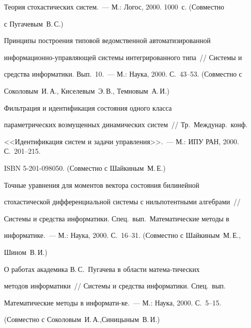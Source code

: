




 Теория стохастических систем.~--- М.: Логос, 2000. 1000~с. (Совместно


с Пугачевым~В.\,С.)





 Принципы построения типовой ведомственной автоматизированной


информационно-управляющей системы интегрированного типа~// Системы и


средства информатики. Вып.~10.~--- М.: Наука, 2000. С.~43--53. (Совместно с


Соколовым~И.\,А., Киселевым~Э.\,В., Темновым~А.\,И.)





 Фильтрация и идентификация состояния одного класса


параметрических возмущенных динамических систем~// Тр.\ Междунар.\ конф.\


<<Идентификация систем и задачи управления>>.~--- М.: ИПУ РАН, 2000. С.~201--215.


ISBN 5-201-098050. (Совместно с Шайкиным~М.\,Е.)





 Точные уравнения для моментов вектора состояния билинейной


стохастической дифференциальной системы с нильпотентными алгебрами~//


Системы и средства информатики. Спец.\ вып.\ Математические методы в


информатике.~--- М.: Наука, 2000. С.~16--31. (Совместно с Шайкиным~М.\,Е.,


Шином~В.\,И.)





 О работах академика В.\,С.~Пугачева в области ма\-те\-ма-\linebreak тических


методов информатики~// Системы и средства ин\-фор\-матики. Спец.\ вып.\


Математические методы в информати-\linebreak ке.~--- М.: Наука, 2000. С.~5--15.


(Совместно с Соколовым~И.\,А.,\linebreak Синицыным~В.\,И.)





